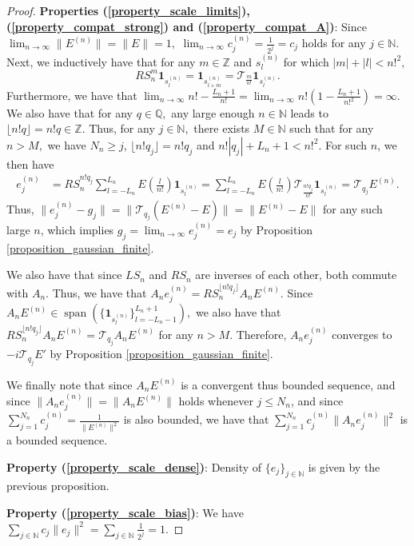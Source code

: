 \documentclass{amsart}
\theoremstyle{definition}
\theoremstyle{remark}
\def \Span{\operatorname{span}}
\begin{document}
\begin{proof}
	\textbf{Properties (\ref{property_scale_limits}), (\ref{property_compat_strong}) and (\ref{property_compat_A})}: Since $\lim_{n\rightarrow\infty}\|E^{(n)}\|=\|E\|=1,$   $\lim_{n\rightarrow\infty} c_j^{(n)}=\frac{1}{2^j}=c_j$ holds for any $j\in\mathbb{N}.$ Next, we inductively have that for any $m\in\mathbb{Z}$ and $s_l^{(n)}$ for which $|m|+|l|<n!^2,$ $$RS_n^m\mathbf{1}_{s_l^{(n)}}=\mathbf{1}_{s_{l+m}^{(n)}}=\mathcal{T}_{\frac{m}{n!}}\mathbf{1}_{s_l^{(n)}}.$$ Furthermore, we have that $\lim_{n\rightarrow\infty}n!-\frac{L_n+1}{n!}=\lim_{n\rightarrow\infty}n!(1-\frac{L_n+1}{n!^2})=\infty$. We also have that for any $q\in\mathbb{Q},$ any large enough $n\in\mathbb{N}$ leads to $\lfloor n!q \rfloor=n!q\in\mathbb{Z}.$ Thus, for any $j\in\mathbb{N},$ there exists $M\in\mathbb{N}$ such that for any $n>M,$ we have  $N_n\geq j$, $\lfloor n!q_j\rfloor=n!q_j$ and $n!|q_j|+L_n+1<n!^2.$ For such $n$, we then have
	\begin{align*}
		e_j^{(n)}&=RS_n^{n!q_j}\sum_{l=-L_n}^{L_n}E\left(\frac{l}{n!}\right)\mathbf{1}_{s_l^{(n)}}=\sum_{l=-L_n}^{L_n}E\left(\frac{l}{n!}\right)\mathcal{T}_{\frac{n!q_j}{n!}}\mathbf{1}_{s_{l}^{(n)}}=\mathcal{T}_{q_j}E^{(n)}.
	\end{align*}
	 Thus, $\|e_j^{(n)}-g_j\|=\|\mathcal{T}_{q_j}(E^{(n)}-E)\|=\|E^{(n)}-E\|$ for any such large $n$, which implies $g_j=\lim_{n\rightarrow\infty} e_j^{(n)}=e_j$  by Proposition \ref{proposition_gaussian_finite}.
	 
	 We also have that since $LS_n$ and $RS_n$ are inverses of each other, both commute with $A_n$. Thus, we have that $A_ne_j^{(n)}=RS_n^{\lfloor n!q_j\rfloor}A_nE^{(n)}.$ Since $A_nE^{(n)}\in\Span(\{\mathbf{1}_{s_l^{(n)}}\}_{l=-L_n-1}^{L_n+1}),$ we also have that $RS_n^{\lfloor n!q_j\rfloor}A_nE^{(n)}=\mathcal{T}_{q_j}A_nE^{(n)}$ for any $n>M.$ Therefore, $A_n e_j^{(n)}$ converges to $-i\mathcal{T}_{q_j}E'$ by Proposition \ref{proposition_gaussian_finite}. 
	 
	 We finally note that since $A_nE^{(n)}$ is a convergent thus bounded sequence, and since $\|A_ne_j^{(n)}\|=\|A_nE^{(n)}\|$ holds whenever $j\leq N_n$, and since $\sum_{j=1}^{N_n}c_j^{(n)}=\frac{1}{\|E^{(n)}\|^2}$ is also bounded, we have that $\sum_{j=1}^{N_n}c_j^{(n)}\|A_ne_j^{(n)}\|^2$ is a bounded sequence.
	
	\textbf{Property (\ref{property_scale_dense})}: Density of $\{e_j\}_{j\in\mathbb{N}}$ is given by the previous proposition.
	
	\textbf{Property (\ref{property_scale_bias})}: We have $\sum_{j\in\mathbb{N}}c_j\|e_j\|^2=\sum_{j\in\mathbb{N}}\frac{1}{2^j}=1.$
	

\end{proof}
\end{document}
